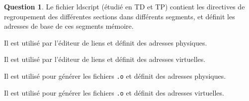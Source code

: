 \documentclass[11pt,english,french]{scrreprt}
\theoremstyle{remark}
\theoremstyle{definition}
\newtheorem{ques}{Question}[section]
\begin{document}
\begin{ques}
	Le fichier ldscript (étudié en TD et TP) contient les directives de regroupement des différentes sections dans différents segments, et définit les adresses de base de ces segments mémoire.
\begin{description}
	\setlength{\itemsep}{2pt}
	\setlength{\parskip}{-1pt}
	\setlength{\parsep}{-1pt}
	\item[\Square] Il est utilisé par l'éditeur de liens et définit des adresses physiques.
	\item[\CheckedBox] Il est utilisé par l'éditeur de liens et définit des adresses virtuelles.
	\item[\Square] Il est utilisé pour générer les fichiers \lstinline!.o! et définit des adresses physiques.
	\item[\Square] Il est utilisé pour générer les fichiers \lstinline!.o! et définit des adresses virtuelles.
\end{description}
\end{ques}
\end{document}
